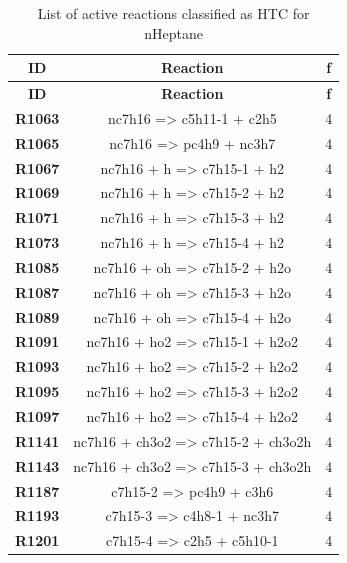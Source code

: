 \begin{longtable}{ccc}
\caption{List of active reactions classified as HTC for nHeptane}\\
\hline
\textbf{ID} & \textbf{Reaction} & \textbf{f} \\
\hline
\endfirsthead
\hline
\textbf{ID} & \textbf{Reaction} & \textbf{f} \\
\hline
\endhead
\textbf{R1063} & nc7h16 =\textgreater{} c5h11-1 + c2h5 & 4 \\
\textbf{R1065} & nc7h16 =\textgreater{} pc4h9 + nc3h7 & 4 \\
\textbf{R1067} & nc7h16 + h =\textgreater{} c7h15-1 + h2 & 4 \\
\textbf{R1069} & nc7h16 + h =\textgreater{} c7h15-2 + h2 & 4 \\
\textbf{R1071} & nc7h16 + h =\textgreater{} c7h15-3 + h2 & 4 \\
\textbf{R1073} & nc7h16 + h =\textgreater{} c7h15-4 + h2 & 4 \\
\textbf{R1085} & nc7h16 + oh =\textgreater{} c7h15-2 + h2o & 4 \\
\textbf{R1087} & nc7h16 + oh =\textgreater{} c7h15-3 + h2o & 4 \\
\textbf{R1089} & nc7h16 + oh =\textgreater{} c7h15-4 + h2o & 4 \\
\textbf{R1091} & nc7h16 + ho2 =\textgreater{} c7h15-1 + h2o2 & 4 \\
\textbf{R1093} & nc7h16 + ho2 =\textgreater{} c7h15-2 + h2o2 & 4 \\
\textbf{R1095} & nc7h16 + ho2 =\textgreater{} c7h15-3 + h2o2 & 4 \\
\textbf{R1097} & nc7h16 + ho2 =\textgreater{} c7h15-4 + h2o2 & 4 \\
\textbf{R1141} & nc7h16 + ch3o2 =\textgreater{} c7h15-2 + ch3o2h & 4 \\
\textbf{R1143} & nc7h16 + ch3o2 =\textgreater{} c7h15-3 + ch3o2h & 4 \\
\textbf{R1187} & c7h15-2 =\textgreater{} pc4h9 + c3h6 & 4 \\
\textbf{R1193} & c7h15-3 =\textgreater{} c4h8-1 + nc3h7 & 4 \\
\textbf{R1201} & c7h15-4 =\textgreater{} c2h5 + c5h10-1 & 4 \\
\hline
\end{longtable}